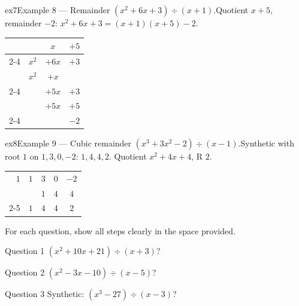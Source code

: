 \documentclass[11pt]{article}
\begin{document}
\begin{example}{ex7}{Example 8 --- Remainder}
$(x^2+6x+3)\div(x+1)$.\soln Quotient $x+5$, remainder $-2$: $x^2+6x+3=(x+1)(x+5)-2$.\begin{center}\renewcommand{\arraystretch}{1.2}\begin{tabular}{cccc}
&  & $x$ & $+5$ \\
\cline{2-4}
\multicolumn{1}{r|}{$x+1$} & $x^2$ & $+6x$ & $+3$ \\
\multicolumn{1}{r|}{} & $x^2$ & $+x$ &  \\
\cline{2-4}
\multicolumn{1}{r|}{} &  & $+5x$ & $+3$ \\
\multicolumn{1}{r|}{} &  & $+5x$ & $+5$ \\
\cline{2-4}
\multicolumn{1}{r|}{} &  &  & $-2$ \\
\end{tabular}\end{center}
\end{example}

\begin{example}{ex8}{Example 9 --- Cubic remainder}
$(x^3+3x^2-2)\div(x-1)$.\soln Synthetic with root $1$ on $1,3,0,-2$: $1,4,4,2$. Quotient $x^2+4x+4$, R $2$.\begin{center}\renewcommand{\arraystretch}{1.2}\begin{tabular}{ccccc}
\multicolumn{1}{r|}{$1$} & $1$ & $3$ & $0$ & $-2$ \\
\multicolumn{1}{r|}{} &  & $1$ & $4$ & $4$ \\
\cline{2-5}
\multicolumn{1}{r|}{} & $1$ & $4$ & $4$ & $2$ \\
\end{tabular}\end{center}
\end{example}

\clearpage
{}
For each question, show all steps clearly in the space provided.

\begin{qbox}{Question 1}
$(x^2+10x+21)\div(x+3)$?\workspace{2.4cm}
\end{qbox}

\begin{qbox}{Question 2}
$(x^2-3x-10)\div(x-5)$?\workspace{2.4cm}
\end{qbox}

\begin{qbox}{Question 3}
Synthetic: $(x^3-27)\div(x-3)$?\workspace{2.4cm}
\end{qbox}
\end{document}
